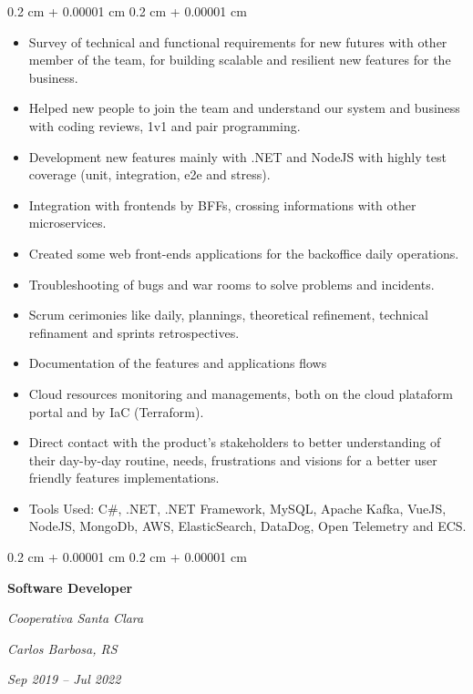 \documentclass[10pt, letterpaper]{article}
\newenvironment{highlights}{
    \begin{itemize}[
        topsep=0.10 cm,
        parsep=0.10 cm,
        partopsep=0pt,
        itemsep=0pt,
        leftmargin=0.4 cm + 10pt
    ]
}{
    \end{itemize}
} %
\newenvironment{onecolentry}{
    \begin{adjustwidth}{
        0.2 cm + 0.00001 cm
    }{
        0.2 cm + 0.00001 cm
    }
}{
    \end{adjustwidth}
} %
\newenvironment{twocolentry}[2][]{
    \onecolentry
    \def\secondColumn{#2}
    \setcolumnwidth{\fill, 4.5 cm}
    \begin{paracol}{2}
}{
    \switchcolumn \raggedleft \secondColumn
    \end{paracol}
    \endonecolentry
} %
\begin{document}
        \vspace{0.10 cm}
        \begin{onecolentry}
            \begin{highlights}
                \item Survey of technical and functional requirements for new futures with other member of the team, for building scalable and resilient new features for the business.
                \item  Helped new people to join the team and understand our system and business with coding reviews, 1v1 and pair programming.
                \item Development new features mainly with .NET and NodeJS with highly test coverage (unit, integration, e2e and stress).
                \item Integration with frontends by BFFs, crossing informations with other microservices.
                \item Created some web front-ends applications for the backoffice daily operations.
                \item Troubleshooting of bugs and war rooms to solve problems and incidents.
                \item Scrum cerimonies like daily, plannings, theoretical refinement, technical refinament and sprints retrospectives.
                \item Documentation of the features and applications flows
                \item Cloud resources monitoring and managements, both on the cloud plataform portal and by IaC (Terraform).
                \item Direct contact with the product's stakeholders to better understanding of their day-by-day routine, needs, frustrations and visions for a better user friendly features implementations.
                \item Tools Used: C\#, .NET, .NET Framework, MySQL, Apache Kafka, VueJS, NodeJS, MongoDb, AWS, ElasticSearch, DataDog, Open Telemetry and ECS.
            \end{highlights}
        \end{onecolentry}

        \begin{twocolentry}{
        \textit{Carlos Barbosa, RS}    
            
        \textit{Sep 2019 – Jul 2022}}
            \textbf{Software Developer}
            
            \textit{Cooperativa Santa Clara}
        \end{twocolentry}
\end{document}
